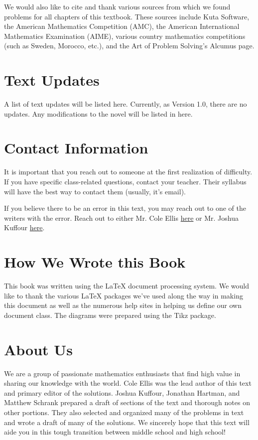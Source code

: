 \documentclass[../book.tex]{subfiles}
\begin{document}
We would also like to cite and thank various sources from which we found problems for all chapters of this textbook.  These sources include Kuta Software, the American Mathematics Competition (AMC), the American International Mathematics Examination (AIME), various country mathematics competitions (such as Sweden, Morocco, etc.), and the Art of Problem Solving's Alcumus page.

\section{Text Updates}
A list of text updates will be listed here.  Currently, as Version 1.0, there are no updates.  Any modifications to the novel will be listed in here.

\section{Contact Information}
It is important that you reach out to someone at the first realization of difficulty.  If you have specific class-related questions, contact your teacher.  Their syllabus will have the best way to contact them (usually, it's email).

If you believe there to be an error in this text, you may reach out to one of the writers with the error.  Reach out to either Mr.  Cole Ellis \href{mailto:elliscole00@gmail.com}{here} or Mr.  Joshua Kuffour \href{mailto:jkuffour1.jk@gmail.com}{here}.

\section{How We Wrote this Book}
This book was written using the \LaTeX{} document processing system.  We would like to thank the various \LaTeX{} packages we've used along the way in making this document as well as the numerous help sites in helping us define our own document class.  The diagrams were prepared using the Tikz package.

\section{About Us}
We are a group of passionate mathematics enthusiasts that find high value in sharing our knowledge with the world.  Cole Ellis was the lead author of this text and primary editor of the solutions.  Joshua Kuffour, Jonathan Hartman, and Matthew Schrank prepared a draft of sections of the text and thorough notes on other portions.  They also selected and organized many of the problems in text and wrote a draft of many of the solutions.  We sincerely hope that this text will aide you in this tough transition between middle school and high school!
\end{document}
